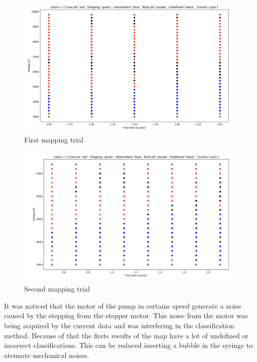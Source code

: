     \begin{figure}[H]
        \center
        \includegraphics[width=15cm]{images/map1.png}
        \caption{First mapping trial}
    \end{figure}

    \begin{figure}[H]
        \center
        \includegraphics[width=15cm]{images/map2.png}
        \caption{Second mapping trial}
    \end{figure}

    It was noticed that the motor of the pump in certains speed generate a noise caused by the stepping from the stepper motor.
    This noise from the motor was being acquired by the current data and was interfering in the classification method.
    Because of that the firsts results of the map have a lot of undefined or incorrect classifications.
    This can be reduced inserting a bubble in the syringe to atenuate mechanical noises. 


